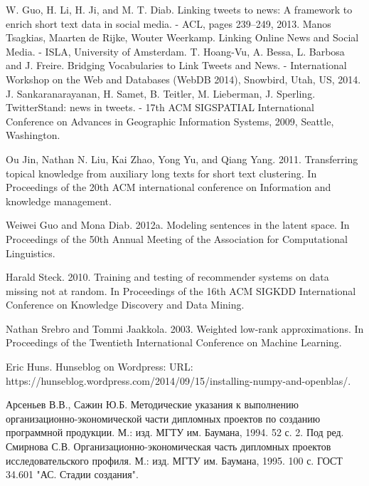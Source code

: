 \clearpage
\begin{thebibliography}{0}
     W. Guo, H. Li, H. Ji, and M. T. Diab. Linking tweets to news: A framework to enrich short text data in social media. - ACL, pages 239–249, 2013.
     Manos Tsagkias, Maarten de Rijke, Wouter Weerkamp. Linking Online News and Social Media. - ISLA, University of Amsterdam.
     T. Hoang-Vu, A. Bessa, L. Barbosa and J. Freire. Bridging Vocabularies to Link Tweets and News. - International Workshop on the Web and Databases (WebDB 2014), Snowbird, Utah, US, 2014.
     J. Sankaranarayanan, H. Samet, B. Teitler, M. Lieberman, J. Sperling. TwitterStand: news in tweets. - 17th ACM SIGSPATIAL International Conference on Advances in Geographic Information Systems, 2009, Seattle, Washington.

     Ou Jin, Nathan N. Liu, Kai Zhao, Yong Yu, and Qiang Yang. 2011. Transferring topical knowledge from auxiliary long texts for short text clustering. In Proceedings of the 20th ACM international conference on Information and knowledge management.

     Weiwei Guo and Mona Diab. 2012a. Modeling sentences in the latent space. In Proceedings of the 50th Annual Meeting of the Association for Computational Linguistics. 

     Harald Steck. 2010. Training and testing of recommender systems on data missing not at random. In Proceedings of the 16th ACM SIGKDD International Conference on Knowledge Discovery and Data Mining.

     Nathan Srebro and Tommi Jaakkola. 2003. Weighted low-rank approximations. In Proceedings of the Twentieth International Conference on Machine Learning.

     Eric Huns. Hunseblog on Wordpress: URL: https://hunseblog.wordpress.com/2014/09/15/installing-numpy-and-openblas/.


     Арсеньев В.В., Сажин Ю.Б. Методические указания к выполнению организационно-экономической части дипломных проектов по созданию программной продукции. М.: изд. МГТУ им. Баумана, 1994. 52 с. 2.
     Под ред. Смирнова С.В. Организационно-экономическая часть дипломных проектов исследовательского профиля. М.: изд. МГТУ им. Баумана, 1995. 100 с.
     ГОСТ 34.601 "АС. Стадии создания".

    \hrulefill

\end{thebibliography}